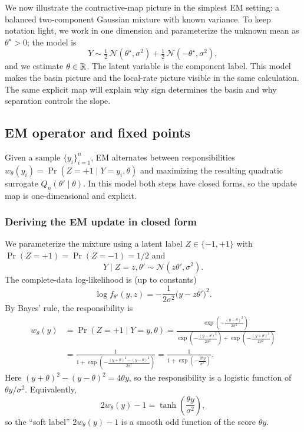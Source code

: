 \documentclass[11pt]{article}
\begin{document}
We now illustrate the contractive-map picture in the simplest EM setting: a balanced two-component Gaussian mixture with known variance.
To keep notation light, we work in one dimension and parameterize the unknown mean as $\theta^\star>0$; the model is
\[
Y \sim \tfrac12\,\mathcal{N}(\theta^\star,\sigma^2) + \tfrac12\,\mathcal{N}(-\theta^\star,\sigma^2),
\]
and we estimate $\theta\in\mathbb{R}$.
The latent variable is the component label.
This model makes the basin picture and the local-rate picture visible in the same calculation.
The same explicit map will explain why sign determines the basin and why separation controls the slope.

\subsection{EM operator and fixed points}
\label{subsec:gmm-em-operator}

Given a sample $\{y_i\}_{i=1}^n$, EM alternates between responsibilities
$w_\theta(y_i)=\Pr(Z=+1\mid Y=y_i,\theta)$ and maximizing the resulting quadratic surrogate $Q_n(\theta'\mid\theta)$.
In this model both steps have closed forms, so the update map is one-dimensional and explicit.

\subsubsection{Deriving the EM update in closed form}
\label{subsubsec:gmm-derivation}

We parameterize the mixture using a latent label $Z\in\{-1,+1\}$ with $\Pr(Z=+1)=\Pr(Z=-1)=1/2$ and
\[
Y\mid Z=z,\theta' \sim \mathcal{N}(z\theta',\sigma^2).
\]
The complete-data log-likelihood is (up to constants)
\[
\log f_{\theta'}(y,z) = -\frac{1}{2\sigma^2}\big(y-z\theta'\big)^2.
\]
By Bayes' rule, the responsibility is
\begin{align*}
w_\theta(y)
&=\Pr(Z=+1\mid Y=y,\theta)
=\frac{\exp\!\left(-\frac{(y-\theta)^2}{2\sigma^2}\right)}{\exp\!\left(-\frac{(y-\theta)^2}{2\sigma^2}\right)+\exp\!\left(-\frac{(y+\theta)^2}{2\sigma^2}\right)} \\
&=\frac{1}{1+\exp\!\left(-\frac{(y+\theta)^2-(y-\theta)^2}{2\sigma^2}\right)}
=\frac{1}{1+\exp\!\left(-\frac{2\theta y}{\sigma^2}\right)}.
\end{align*}
Here $(y+\theta)^2-(y-\theta)^2=4\theta y$, so the responsibility is a logistic function of $\theta y/\sigma^2$.
Equivalently,
\[
2w_\theta(y)-1 = \tanh\!\left(\frac{\theta y}{\sigma^2}\right),
\]
so the ``soft label'' $2w_\theta(y)-1$ is a smooth odd function of the score $\theta y$.
\end{document}
